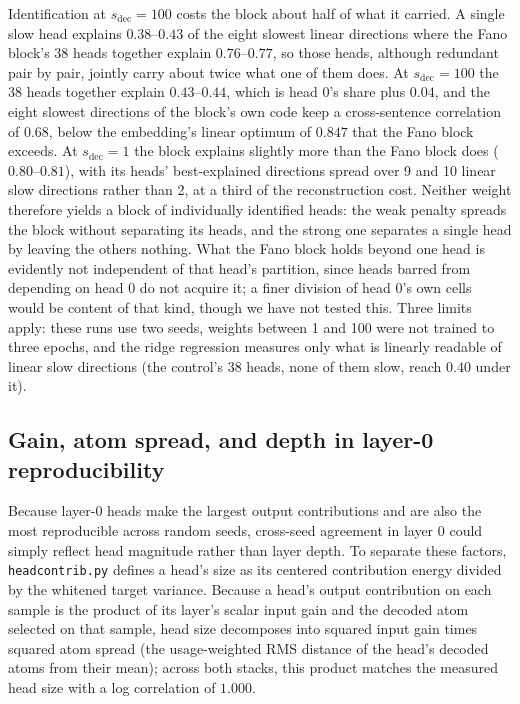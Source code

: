 Identification at $s_{\mathrm{dec}}{=}100$ costs the block about half of
what it carried. A single slow head explains $0.38$--$0.43$ of the eight slowest
linear directions where the Fano block's 38 heads together explain
$0.76$--$0.77$, so those heads, although redundant pair by pair, jointly
carry about twice what one of them does. At $s_{\mathrm{dec}}{=}100$ the
38 heads
together explain $0.43$--$0.44$, which is head 0's share plus $0.04$, and
the eight slowest directions of the block's own code keep a
cross-sentence correlation of $0.68$, below the embedding's linear
optimum of $0.847$ that the Fano block exceeds. At $s_{\mathrm{dec}}{=}1$
the block
explains slightly more than the Fano block does ($0.80$--$0.81$), with
its heads' best-explained directions spread over 9 and 10 linear slow
directions rather than 2, at a third of the reconstruction cost. Neither
weight therefore yields a block of individually identified heads: the
weak penalty spreads the block without separating its heads, and the
strong one separates a single head by leaving the others nothing. What
the Fano block holds beyond one head is evidently not independent of
that head's partition, since heads barred from depending on head 0 do
not acquire it; a finer division of head 0's own cells would be content
of that kind, though we have not tested this. Three limits apply: these
runs use two seeds, weights between 1 and 100 were not trained to three
epochs, and the ridge regression measures only what is linearly readable
of linear slow directions (the control's 38 heads, none of them slow,
reach $0.40$ under it).

\subsection{Gain, atom spread, and depth in layer-0 reproducibility}
\label{sec:l0size}

Because layer-0 heads make the largest output contributions and are also
the most reproducible across random seeds, cross-seed agreement in layer 0
could simply reflect head magnitude rather than layer depth. To separate
these factors, \texttt{headcontrib.py} defines a head's size as its
centered contribution energy divided by the whitened target variance.
Because a head's output contribution on each sample is the product of its
layer's scalar input gain and the decoded atom selected on that sample,
head size decomposes into squared input gain times squared atom spread
(the usage-weighted RMS distance of the head's decoded atoms from their
mean); across both stacks, this product matches the measured head size
with a log correlation of $1.000$.

